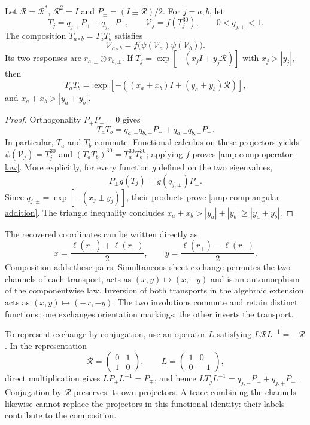 \begin{proposition}
\label{amp-comp-operator}
Let $\mathcal R=\mathcal R^*$, $\mathcal R^2=I$ and
$P_\pm=(I\pm\mathcal R)/2$. For $j=a,b$, let
\[
 T_j=q_{j,+}P_++q_{j,-}P_-,\qquad
 \mathcal V_j=f(T_j^{30}),\qquad 0<q_{j,\pm}<1.
\]
The composition $T_{a\circ b}=T_aT_b$ satisfies
\begin{equation}
 \mathcal V_{a\circ b}
 =f\bigl(\psi(\mathcal V_a)\psi(\mathcal V_b)\bigr).
 \label{amp-comp-operator-law}
\end{equation}
Its two responses are $r_{a,\pm}\odot r_{b,\pm}$. If
$T_j=\exp[-(x_jI+y_j\mathcal R)]$ with $x_j>|y_j|$, then
\begin{equation}
 T_aT_b=
 \exp[-((x_a+x_b)I+(y_a+y_b)\mathcal R)],
 \label{amp-comp-angular-addition}
\end{equation}
and $x_a+x_b>|y_a+y_b|$.
\end{proposition}
\begin{proof}
Orthogonality $P_+P_-=0$ gives
\[
 T_aT_b=q_{a,+}q_{b,+}P_++q_{a,-}q_{b,-}P_-.
\]
In particular, $T_a$ and $T_b$ commute. Functional calculus on these
projectors yields
$\psi(\mathcal V_j)=T_j^{30}$ and
$(T_aT_b)^{30}=T_a^{30}T_b^{30}$; applying $f$ proves
\eqref{amp-comp-operator-law}. More explicitly, for every function $g$
defined on the two eigenvalues,
\[
 P_\pm g(T_j)=g(q_{j,\pm})P_\pm.
\]
Since $q_{j,\pm}=\exp[-(x_j\pm y_j)]$, their products prove
\eqref{amp-comp-angular-addition}. The triangle inequality concludes
$x_a+x_b>|y_a|+|y_b|\geq|y_a+y_b|$.
\end{proof}

The recovered coordinates can be written directly as
\[
 x=\frac{\ell(r_+)+\ell(r_-)}2,\qquad
 y=\frac{\ell(r_+)-\ell(r_-)}2.
\]
Composition adds these pairs. Simultaneous sheet exchange permutes the
two channels of each transport, acts as $(x,y)\mapsto(x,-y)$ and is an
automorphism of the componentwise law. Inversion of both transports in
the algebraic extension acts as $(x,y)\mapsto(-x,-y)$. The two
involutions commute and retain distinct functions: one exchanges
orientation markings; the other inverts the transport.

To represent exchange by conjugation, use an operator $L$ satisfying
$L\mathcal R L^{-1}=-\mathcal R$. In the representation
\[
 \mathcal R=\begin{pmatrix}0&1\\1&0\end{pmatrix},\qquad
 L=\begin{pmatrix}1&0\\0&-1\end{pmatrix},
\]
direct multiplication gives $LP_\pm L^{-1}=P_\mp$, and hence
$LT_jL^{-1}=q_{j,-}P_++q_{j,+}P_-$. Conjugation by $\mathcal R$
preserves its own projectors. A trace combining the channels likewise
cannot replace the projectors in this functional identity: their labels
contribute to the composition.

